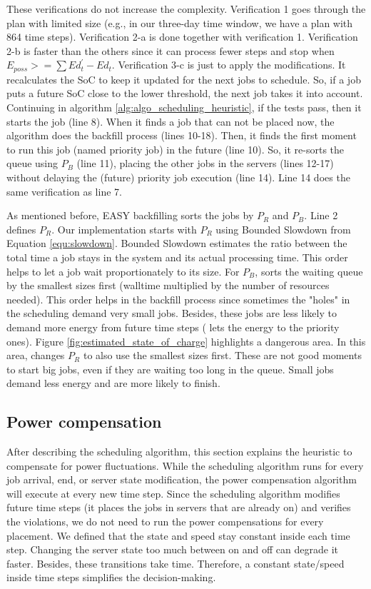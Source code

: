 These verifications do not increase the complexity. Verification 1 goes through the plan with limited size (e.g., in our three-day time window, we have a plan with 864 time steps). Verification 2-a is done together with verification 1. Verification 2-b is faster than the others since it can process fewer steps and stop when $E_{poss} >= \sum Ed_t^{'} - Ed_t$. Verification 3-c is just to apply the modifications. It recalculates the SoC to keep it updated for the next jobs to schedule. So, if a job puts a future SoC close to the lower threshold, the next job takes it into account. Continuing in algorithm \ref{alg:algo_scheduling_heuristic}, if the tests pass, then it starts the job (line 8). When it finds a job that can not be placed now, the algorithm does the backfill process (lines 10-18). Then, it finds the first moment to run this job (named priority job) in the future (line 10). So, it re-sorts the queue using $P_{B}$ (line 11), placing the other jobs in the servers (lines 12-17) without delaying the (future) priority job execution (line 14). Line 14 does the same verification as line 7.

As mentioned before, EASY backfilling sorts the jobs by $P_{R}$ and $P_{B}$. Line 2 defines $P_{R}$. Our implementation starts with $P_{R}$ using Bounded Slowdown from Equation \ref{equ:slowdown}. Bounded Slowdown estimates the ratio between the total time a job stays in the system and its actual processing time. This order helps to let a job wait proportionately to its size. For $P_{B}$, \emph{\systemName} sorts the waiting queue by the smallest sizes first (walltime multiplied by the number of resources needed). This order helps in the backfill process since sometimes the "holes" in the scheduling demand very small jobs. Besides, these jobs are less likely to demand more energy from future time steps (\emph{\systemName} lets the energy to the priority ones). Figure \ref{fig:estimated_state_of_charge} highlights a dangerous area. In this area, \emph{\systemName} changes $P_{R}$ to also use the smallest sizes first. These are not good moments to start big jobs, even if they are waiting too long in the queue. Small jobs demand less energy and are more likely to finish.

\subsection{Power compensation}
\label{sec:model_compensations}

After describing the scheduling algorithm, this section explains the heuristic to compensate for power fluctuations. While the scheduling algorithm runs for every job arrival, end, or server state modification, the power compensation algorithm will execute at every new time step. Since the scheduling algorithm modifies future time steps (it places the jobs in servers that are already on) and verifies the violations, we do not need to run the power compensations for every placement. We defined that the state and speed stay constant inside each time step. Changing the server state too much between on and off can degrade it faster. Besides, these transitions take time. Therefore, a constant state/speed inside time steps simplifies the decision-making.


